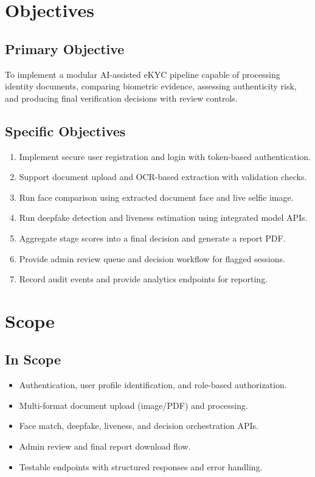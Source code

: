 \section{Objectives}
\subsection{Primary Objective}
To implement a modular AI-assisted eKYC pipeline capable of processing identity documents, comparing biometric evidence, assessing authenticity risk, and producing final verification decisions with review controls.

\subsection{Specific Objectives}
\begin{enumerate}[label=\textbf{OBJ-\arabic*:}]
\item Implement secure user registration and login with token-based authentication.
\item Support document upload and OCR-based extraction with validation checks.
\item Run face comparison using extracted document face and live selfie image.
\item Run deepfake detection and liveness estimation using integrated model APIs.
\item Aggregate stage scores into a final decision and generate a report PDF.
\item Provide admin review queue and decision workflow for flagged sessions.
\item Record audit events and provide analytics endpoints for reporting.
\end{enumerate}

\section{Scope}
\subsection{In Scope}
\begin{itemize}
\item Authentication, user profile identification, and role-based authorization.
\item Multi-format document upload (image/PDF) and processing.
\item Face match, deepfake, liveness, and decision orchestration APIs.
\item Admin review and final report download flow.
\item Testable endpoints with structured responses and error handling.
\end{itemize}

